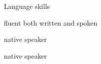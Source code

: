 \begin{rubric}{Language skills}

\entry*[English]

fluent both written and spoken

\entry*[Slovak]

native speaker

\entry*[Czech]

native speaker

\end{rubric}